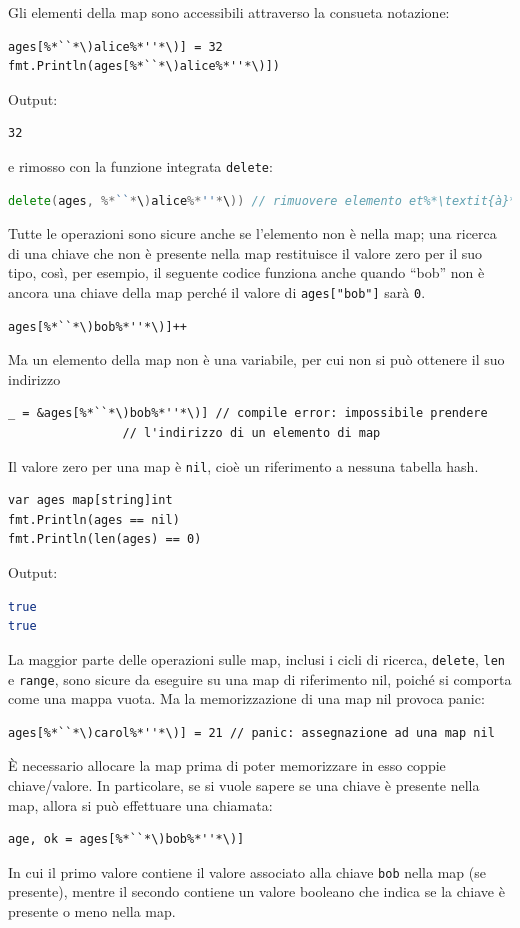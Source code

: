 Gli elementi della map sono accessibili attraverso la consueta notazione:
\begin{lstlisting}[frame=single, label={lst:lstlisting3-3.4}]
ages[%*``*\)alice%*''*\)] = 32
fmt.Println(ages[%*``*\)alice%*''*\)])
\end{lstlisting}
Output:
\begin{lstlisting}[language=bash, frame=L, label={lst:lstlisting3-3.5}]
32
\end{lstlisting}
e rimosso con la funzione integrata \verb|delete|:
\begin{lstlisting}[language=go, frame=single, label={lst:lstlisting3-3.6}]
delete(ages, %*``*\)alice%*''*\)) // rimuovere elemento et%*\textit{à}*\)[%*``*\)alice%*''*\)]
\end{lstlisting}
Tutte le operazioni sono sicure anche se l'elemento non è nella map;
una ricerca di una chiave che non è presente nella map restituisce il valore zero per il suo tipo, così, per esempio, il seguente codice funziona anche quando ``bob'' non è ancora una chiave della map perché il valore di \verb|ages["bob"]| sarà \verb|0|.
\begin{lstlisting}[frame=single, label={lst:lstlisting3-3.7}]
ages[%*``*\)bob%*''*\)]++
\end{lstlisting}
Ma un elemento della map non è una variabile, per cui non si può ottenere il suo indirizzo
\begin{lstlisting}[frame=single, label={lst:lstlisting3-3.8}]
_ = &ages[%*``*\)bob%*''*\)] // compile error: impossibile prendere
                // l'indirizzo di un elemento di map
\end{lstlisting}
Il valore zero per una map è \verb|nil|, cioè un riferimento a nessuna tabella hash.
\begin{lstlisting}[frame=single, label={lst:lstlisting3-3.9}]
var ages map[string]int
fmt.Println(ages == nil)
fmt.Println(len(ages) == 0)
\end{lstlisting}
Output:
\begin{lstlisting}[language=bash, frame=L, label={lst:lstlisting3-3.10}]
true
true
\end{lstlisting}
La maggior parte delle operazioni sulle map, inclusi i cicli di ricerca, \verb|delete|, \verb|len| e \verb|range|, sono sicure da eseguire su una map di riferimento nil, poiché si comporta come una mappa vuota.
Ma la memorizzazione di una map nil provoca panic:
\begin{lstlisting}[frame=single, label={lst:lstlisting3-3.11}]
ages[%*``*\)carol%*''*\)] = 21 // panic: assegnazione ad una map nil
\end{lstlisting}
È necessario allocare la map prima di poter memorizzare in esso coppie chiave/valore.
In particolare, se si vuole sapere se una chiave è presente nella map, allora si può effettuare una chiamata:
\begin{lstlisting}[frame=single, label={lst:lstlisting3-3.12}]
age, ok = ages[%*``*\)bob%*''*\)]
\end{lstlisting}
In cui il primo valore contiene il valore associato alla chiave \verb|bob| nella map (se presente), mentre il secondo contiene un valore booleano che indica se la chiave è presente o meno nella map.

